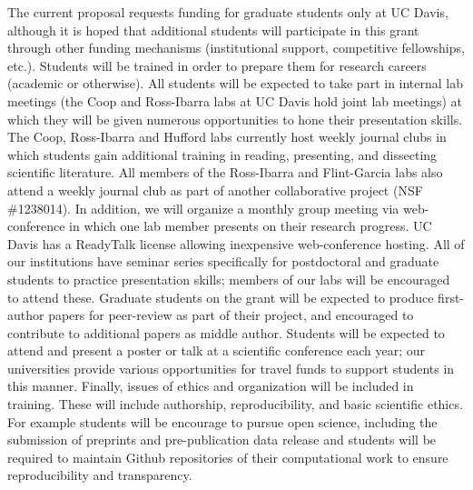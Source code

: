 The current proposal requests funding for graduate students only at UC Davis, although it is hoped that additional students will participate in this grant through other funding mechanisms (institutional support, competitive fellowships, etc.). Students will be trained in order to prepare them for research careers (academic or otherwise).  All students will be expected to take part in internal lab meetings (the Coop and Ross-Ibarra labs at UC Davis hold joint lab meetings) at which they will be given numerous opportunities to hone their presentation skills.  The Coop, Ross-Ibarra and Hufford labs currently host weekly journal clubs in which students gain additional training in reading, presenting, and dissecting scientific literature. All members of the Ross-Ibarra and Flint-Garcia labs also attend a weekly journal club as part of another collaborative project (NSF \#1238014). In addition, we will organize a monthly group meeting via web-conference in which one lab member presents on their research progress.  UC Davis has a ReadyTalk license allowing inexpensive web-conference hosting. All of our institutions have seminar series specifically for postdoctoral and graduate students to practice presentation skills; members of our labs will be encouraged to attend these.
Graduate students on the grant will be expected to produce first-author papers for peer-review as part of their project, and encouraged to contribute to additional papers as middle author.  Students will be expected to attend and present a poster or talk at a scientific conference each year; our universities provide various opportunities for travel funds to support students in this manner. Finally, issues of ethics and organization will be included in training.  These will include authorship, reproducibility, and basic scientific ethics. For example students will be encourage to pursue open science, including the submission of preprints and pre-publication data release and students will be required to maintain Github repositories of their computational work to ensure reproducibility and transparency.

 